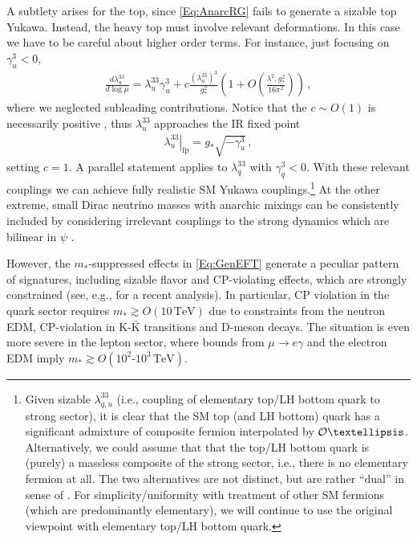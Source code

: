 \documentclass[aps,prl,twocolumn,showpacs,10pt,preprintnumbers,nofootinbib]{revtex4-2}
\newcommand{\TeV}{\,\mathrm{TeV}}
\newcommand{\gst}{g_*}
\newcommand{\mst}{m_*}
\newcommand{\fp}[1]{{\left.#1\right|_{\text{fp}}}}
\begin{document}
A subtlety arises for the top, since \eqref{Eq:AnarcRG} fails to generate a sizable top Yukawa. Instead, the heavy top must involve relevant deformations. In this case we have to be careful about higher order terms. For instance, just focusing on $\gamma_{u}^3<0$,
\begin{align}\label{Eq:RGTopAnarchy}
\frac{d \lambda^{33}_u }{d \log \mu} = \lambda_u^{33} \gamma^3_u + c\frac{(\lambda_u^{33} )^3}{\gst^2} \left(1+O\left(\frac{\lambda^2,\gst^2}{16 \pi^2} \right) \right) \,,
\end{align}
where we neglected subleading contributions. Notice that the $c\sim O(1)$ is necessarily positive \cite{Vecchi:2015fma}, thus
$\lambda_{u}^{33}$ approaches the IR fixed point 
\begin{align}\label{Eq:AnarcRGtop}
   \fp{ \lambda^{33}_{u}} = \gst \sqrt{- \gamma_u^3}\,,
\end{align}
setting $c=1$.
A parallel statement applies to $\lambda_{q}^{33}$ with $\gamma_q^3<0$. With these relevant couplings we can achieve fully realistic SM Yukawa couplings.\footnote{Given sizable $\lambda^{33}_{q,u}$ (i.e., coupling of elementary top/LH bottom quark to strong sector), it is clear that the SM top (and LH bottom) quark has a significant admixture of composite fermion interpolated by ${\cal O}…$.
Alternatively, we could assume that that the top/LH bottom quark is (purely) a massless composite of the strong sector, i.e., there is no elementary fermion at all. The two alternatives are not distinct, but are rather ``dual'' in sense of \cite{Contino:2004vy}. For simplicity/uniformity with treatment of other SM fermions (which are predominantly elementary), we will continue to use the original viewpoint with elementary top/LH bottom quark.} At the other extreme, small Dirac neutrino masses with anarchic mixings can be consistently included by considering irrelevant couplings to the strong dynamics which are bilinear in $\psi$ \cite{Agashe:2008fe}.

However, the $\mst$-suppressed effects in \eqref{Eq:GenEFT} generate a peculiar pattern of signatures, including sizable flavor and CP-violating effects, which are strongly constrained (see, e.g., \cite{Glioti:2024hye} for a recent analysis). In particular, CP violation in the quark sector requires $\mst\gtrsim O(10 \TeV)$ due to constraints from the neutron EDM, CP-violation in $\text{K}\text{-}\bar{\text{K}}$ transitions and D-meson decays. The situation is even more severe in the lepton sector, where bounds from $\mu \to e \gamma$ and the electron EDM imply $\mst\gtrsim O(10^2\text{-}10^3 \TeV)$.
\end{document}

